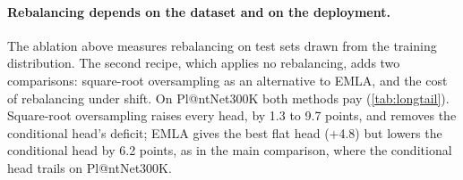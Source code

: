 \paragraph{Rebalancing depends on the dataset and on the deployment.}
The ablation above measures rebalancing on test sets drawn from the training distribution.
The second recipe, which applies no rebalancing, adds two comparisons: square-root oversampling as an alternative to EMLA, and the cost of rebalancing under shift.
On Pl@ntNet300K both methods pay (\cref{tab:longtail}).
Square-root oversampling raises every head, by 1.3 to 9.7 points, and removes the conditional head's deficit; EMLA gives the best flat head (+4.8) but lowers the conditional head by 6.2 points, as in the main comparison, where the conditional head trails on Pl@ntNet300K.


